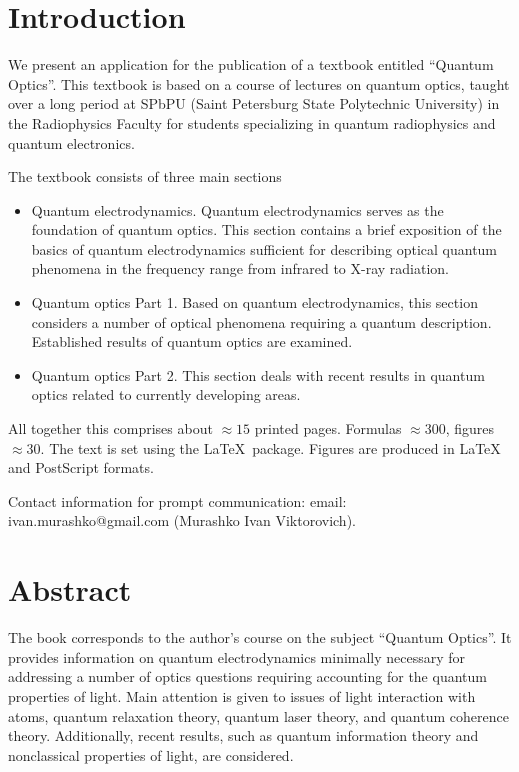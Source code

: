 


\Russian


\section*{Introduction}
We present an application for the publication of a textbook entitled ``Quantum Optics''. This textbook is based on a course of lectures on quantum optics, taught over a long period at SPbPU (Saint Petersburg State Polytechnic University) in the Radiophysics Faculty for students specializing in quantum radiophysics and quantum electronics.

The textbook consists of three main sections
\begin{itemize}
\item Quantum electrodynamics. Quantum electrodynamics serves as the foundation of quantum optics. This section contains a brief exposition of the basics of quantum electrodynamics sufficient for describing optical quantum phenomena in the frequency range from infrared to X-ray radiation.
\item Quantum optics Part 1. Based on quantum electrodynamics, this section considers a number of optical phenomena requiring a quantum description. Established results of quantum optics are examined.
\item Quantum optics Part 2. This section deals with recent results in quantum optics related to currently developing areas.
\end{itemize}
All together this comprises about \(\approx 15\) printed pages. Formulas \(\approx 300\), figures \(\approx 30\). The text is set using the \LaTeX\ package. Figures are produced in {\LaTeX} and PostScript formats.

Contact information for prompt communication: email: ivan.murashko@gmail.com (Murashko Ivan Viktorovich).

\section{Abstract}
The book corresponds to the author's course on the subject ``Quantum Optics''. It provides information on quantum electrodynamics minimally necessary for addressing a number of optics questions requiring accounting for the quantum properties of light. Main attention is given to issues of light interaction with atoms, quantum relaxation theory, quantum laser theory, and quantum coherence theory. Additionally, recent results, such as quantum information theory and nonclassical properties of light, are considered.

